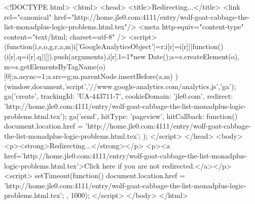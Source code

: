 <!DOCTYPE html>
<html>
<head>
<title>Redirecting...</title>
<link rel="canonical" href="http://home.jle0.com:4111/entry/wolf-goat-cabbage-the-list-monadplus-logic-problems.html.tex"/>
<meta http-equiv="content-type" content="text/html; charset=utf-8" />
<script>
(function(i,s,o,g,r,a,m){i['GoogleAnalyticsObject']=r;i[r]=i[r]||function(){
(i[r].q=i[r].q||[]).push(arguments)},i[r].l=1*new Date();a=s.createElement(o),
m=s.getElementsByTagName(o)[0];a.async=1;a.src=g;m.parentNode.insertBefore(a,m)
})(window,document,'script','//www.google-analytics.com/analytics.js','ga');
ga('create', { trackingId: 'UA-443711-7', cookieDomain: 'jle0.com', redirect: 'http://home.jle0.com:4111/entry/wolf-goat-cabbage-the-list-monadplus-logic-problems.html.tex'});
ga('send', { hitType: 'pageview', hitCallback: function() { document.location.href = 'http://home.jle0.com:4111/entry/wolf-goat-cabbage-the-list-monadplus-logic-problems.html.tex'; } });
</script>
</head>
<body>
  <p><strong>Redirecting...</strong></p>
  <p><a href='http://home.jle0.com:4111/entry/wolf-goat-cabbage-the-list-monadplus-logic-problems.html.tex'>Click here if you are not redirected.</a></p>
  <script>
    setTimeout(function() { document.location.href = 'http://home.jle0.com:4111/entry/wolf-goat-cabbage-the-list-monadplus-logic-problems.html.tex'; }, 1000);
  </script>
</body>
</html>

